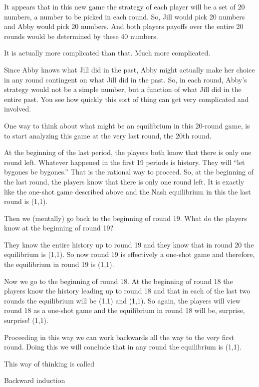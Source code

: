 \documentclass[
]{book}
\begin{document}
It appears that in this new game the strategy of each player will be a set of 20 numbers, a number to be picked in each round. So, Jill would pick 20 numbers and Abby would pick 20 numbers. And both players payoffs over the entire 20 rounds would be determined by these 40 numbers.

It is actually more complicated than that. Much more complicated.

Since Abby knows what Jill did in the past, Abby might actually make her choice in any round contingent on what Jill did in the past. So, in each round, Abby's strategy would not be a simple number, but a function of what Jill did in the entire past. You see how quickly this sort of thing can get very complicated and involved.

One way to think about what might be an equilibrium in this 20-round game, is to start analyzing this game at the very last round, the 20th round.

At the beginning of the last period, the players both know that there is only one round left. Whatever happened in the first 19 periods is history. They will ``let bygones be bygones.'' That is the rational way to proceed. So, at the beginning of the last round, the players know that there is only one round left. It is exactly like the one-shot game described above and the Nash equilibrium in this the last round is (1,1).

Then we (mentally) go back to the beginning of round 19. What do the players know at the beginning of round 19?

They know the entire history up to round 19 and they know that in round 20 the equilibrium is (1,1). So now round 19 is effectively a one-shot game and therefore, the equilibrium in round 19 is (1,1).

Now we go to the beginning of round 18. At the beginning of round 18 the players know the history leading up to round 18 and that in each of the last two rounds the equilibrium will be (1,1) and (1,1). So again, the players will view round 18 as a one-shot game and the equilibrium in round 18 will be, surprise, surprise! (1,1).

Proceeding in this way we can work backwards all the way to the very first round. Doing this we will conclude that in any round the equilibrium is (1,1).

This way of thinking is called

\begin{center}
Backward induction

\end{center}
\end{document}
